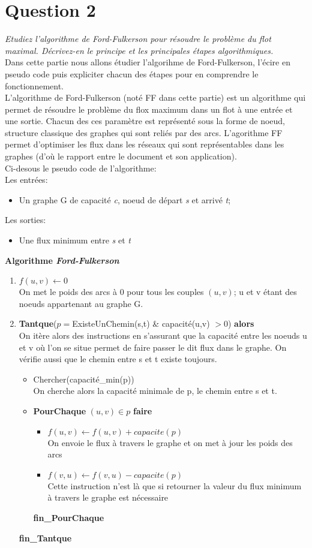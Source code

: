 \section{Question 2}
\textit{Etudiez l'algorithme de Ford-Fulkerson pour résoudre le problème du flot maximal. Décrivez-en le principe et les principales étapes algorithmiques.}\\
Dans cette partie nous allons étudier l'algorihme de Ford-Fulkerson, l'écire en pseudo code puis expliciter chacun des étapes pour en comprendre le fonctionnement.\\
L'algorithme de Ford-Fulkerson (noté FF dans cette partie) est un algorithme qui permet de résoudre le problème du flox maximum dans un flot à une entrée et une sortie. Chacun des ces paramètre est représenté sous la forme de noeud, structure classique des graphes qui sont reliés par des arcs. L'agorithme FF permet d'optimiser les flux dans les réseaux qui sont représentables dans les graphes (d'où le rapport entre le document et son application).\\
Ci-desous le pseudo code de l'algorithme:\\
Les entrées:\begin{itemize}
\item Un graphe G de capacité \textit{c}, noeud de départ \textit{s} et arrivé \textit{t};
\end{itemize}
Les sorties:\begin{itemize}
\item Une flux minimum entre \textit{s} et \textit{t}
\end{itemize}
\textbf{Algorithme \textit{Ford-Fulkerson}}
\begin{enumerate}
\item $f(u,v) \leftarrow 0$ \\ On met le poids des arcs à 0 pour tous les couples $(u,v)$; u et v étant des noeuds appartenant au graphe G.
\item \textbf{Tantque}($p=$ExisteUnChemin(s,t) \& capacité(u,v) $> 0$) \textbf{alors}\\
On itère alors des instructions en s'assurant que la capacité entre les noeuds u et v où l'on se situe permet de faire passer le dit flux dans le graphe. On vérifie aussi que le chemin entre s et t existe toujours.
\begin{itemize}
\item Chercher(capacité\_min(p))\\
On cherche alors la capacité minimale de p, le chemin entre s et t.
\item \textbf{PourChaque} $(u,v)\in p$ \textbf{faire}
\begin{itemize}
\item $f(u,v) \leftarrow f(u,v) + capacite(p)$\\
On envoie le flux à travers le graphe et on met à jour les poids des arcs
\item $f(v,u) \leftarrow f(v,u) - capacite(p)$\\
Cette instruction n'est là que si retourner la valeur du flux minimum à travers le graphe est nécessaire
\end{itemize}
\textbf{fin\_PourChaque}
\end{itemize}
\textbf{fin\_Tantque}
\end{enumerate}
